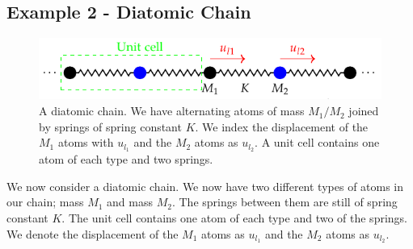 \newpage 
\subsection{Example 2 - Diatomic Chain}

\begin{figure}[htbp]
    \centering
    \includegraphics[]{Images/fig-diachaincartoon.pdf}
    
    \caption{A diatomic chain. We have alternating atoms of mass $M_1/M_2$ joined by springs of spring constant $K$. We index the displacement of the $M_1$ atoms with $u_{l_1}$ and the $M_2$ atoms as $u_{l_2}$. A unit cell contains one atom of each type and two springs.}
    \label{fig-diachaincartoon}
\end{figure}
We now consider a diatomic chain. We now have two different types of atoms in our chain; mass $M_1$ and mass $M_2$. The springs between them are still of spring constant $K$. The unit cell contains one atom of each type and two of the springs. We denote the displacement of the $M_1$ atoms as $u_{l_1}$ and the $M_2$ atoms as $u_{l_2}$.



